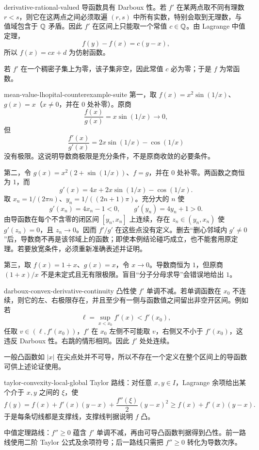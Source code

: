 \begin{solution}{derivative-rational-valued}
导函数具有 Darboux 性。若 \(f'\) 在某两点取不同有理数 \(r<s\)，则它在这两点之间必须取遍 \((r,s)\) 中所有实数，特别会取到无理数，与值域包含于 \(\mathbb{Q}\) 矛盾。因此 \(f'\) 在区间上只能取一个常值 \(c\in\mathbb{Q}\)。由 Lagrange 中值定理，
\[
 f(y)-f(x)=c(y-x),
\]
所以 \(f(x)=cx+d\) 为仿射函数。

若 \(f'\) 在一个稠密子集上为零，该子集非空，因此常值 \(c\) 必为零；于是 \(f\) 为常函数。
\end{solution}

\begin{solution}{mean-value-lhopital-counterexample-suite}
第一，取 \(f(x)=x^2\sin(1/x)\)、\(g(x)=x\)（\(x\ne0\)，并在 \(0\) 处补零）。原商
\[
 \frac{f(x)}{g(x)}=x\sin(1/x)\longrightarrow0,
\]
但
\[
 \frac{f'(x)}{g'(x)}=2x\sin(1/x)-\cos(1/x)
\]
没有极限。这说明导数商极限是充分条件，不是原商收敛的必要条件。

第二，令 \(g(x)=x^2(2+\sin(1/x))\)、\(f=g\)，并在 \(0\) 处补零。两函数之商恒为 \(1\)，而
\[
 g'(x)=4x+2x\sin(1/x)-\cos(1/x).
\]
取 \(x_n=1/(2\pi n)\)、\(y_n=1/((2n+1)\pi)\)。充分大的 \(n\) 使
\[
 g'(x_n)=4x_n-1<0,\qquad g'(y_n)=4y_n+1>0.
\]
由导函数在每个不含零的闭区间 \([y_n,x_n]\) 上连续，存在 \(z_n\in(y_n,x_n)\) 使 \(g'(z_n)=0\)，且 \(z_n\to0\)。因而 \(f'/g'\) 在这些点没有定义。删去“删心邻域内 \(g'\ne0\)”后，导数商不再是该邻域上的函数；即使本例结论碰巧成立，也不能套用原定理。若要放宽条件，必须重新准确表述并证明。

第三，取 \(f(x)=1+x\)、\(g(x)=x\)，令 \(x\to0\)。导数商恒为 \(1\)，但原商 \((1+x)/x\) 不是未定式且无有限极限。盲目“分子分母求导”会错误地给出 \(1\)。
\end{solution}

\begin{solution}{darboux-convex-derivative-continuity}
凸性使 \(f'\) 单调不减。若单调函数在 \(x_0\) 不连续，则它的左、右极限存在，并且至少有一侧与函数值之间留出非空开区间。例如若
\[
 \ell=\sup_{x<x_0}f'(x)<f'(x_0),
\]
任取 \(v\in(\ell,f'(x_0))\)，\(f'\) 在 \(x_0\) 左侧不可能取 \(v\)，右侧又不小于 \(f'(x_0)\)，这违反 Darboux 性。右跳的情形相同。因此 \(f'\) 处处连续。

一般凸函数如 \(|x|\) 在尖点处并不可导，所以不存在一个定义在整个区间上的导函数可供上述论证使用。
\end{solution}

\begin{solution}{taylor-convexity-local-global}
Taylor 路线：对任意 \(x,y\in I\)，Lagrange 余项给出某个介于 \(x,y\) 之间的 \(\xi\)，使
\[
 f(y)=f(x)+f'(x)(y-x)+\frac{f''(\xi)}2(y-x)^2
 \ge f(x)+f'(x)(y-x).
\]
于是每条切线都是支撑线，支撑线判据说明 \(f\) 凸。

中值定理路线：\(f''\ge0\) 蕴含 \(f'\) 单调不减，再由可导凸函数判据得到凸性。前一路线使用二阶 Taylor 公式及余项符号；后一路线只需把 \(f''\ge0\) 转化为导数次序。
\end{solution}

